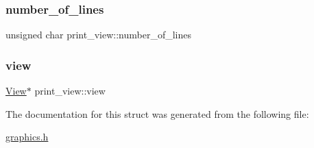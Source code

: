 \mbox{\label{structprint__view_a8f1ab6ae1c7d65a6535ce9cc3fa128b1}} 
\subsubsection{\texorpdfstring{number\+\_\+of\+\_\+lines}{number\_of\_lines}}
{\footnotesize\ttfamily unsigned char print\+\_\+view\+::number\+\_\+of\+\_\+lines}

\mbox{\label{structprint__view_a189a4274f84ccdacb6210281d0163c7a}} 
\subsubsection{\texorpdfstring{view}{view}}
{\footnotesize\ttfamily \hyperlink{structView}{View}$\ast$ print\+\_\+view\+::view}



The documentation for this struct was generated from the following file\+:\begin{DoxyCompactItemize}
\item 
\hyperlink{graphics_8h}{graphics.\+h}\end{DoxyCompactItemize}

